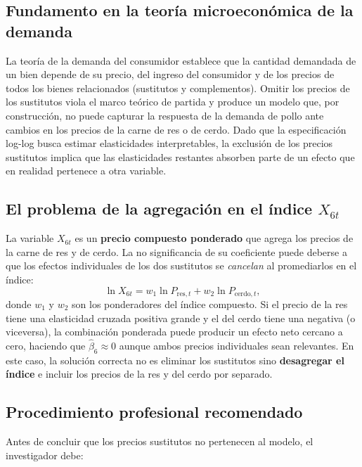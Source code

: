 \documentclass[12pt, letterpaper]{article}
\begin{document}
\subsection{Fundamento en la teoría microeconómica de la demanda}

La teoría de la demanda del consumidor establece que la cantidad demandada
de un bien depende de su precio, del ingreso del consumidor y de los
precios de todos los bienes relacionados (sustitutos y complementos).
Omitir los precios de los sustitutos viola el marco teórico de partida
y produce un modelo que, por construcción, no puede capturar la
respuesta de la demanda de pollo ante cambios en los precios de la carne
de res o de cerdo. Dado que la especificación log-log busca estimar
elasticidades interpretables, la exclusión de los precios sustitutos
implica que las elasticidades restantes absorben parte de un efecto
que en realidad pertenece a otra variable.

\subsection{El problema de la agregación en el índice $X_{6t}$}

La variable $X_{6t}$ es un \textbf{precio compuesto ponderado} que
agrega los precios de la carne de res y de cerdo. La no significancia
de su coeficiente puede deberse a que los efectos individuales de los
dos sustitutos se \emph{cancelan} al promediarlos en el índice:
\begin{equation}
  \ln X_{6t} = w_1 \ln P_{\text{res},t} + w_2 \ln P_{\text{cerdo},t},
  \label{eq:indice}
\end{equation}
donde $w_1$ y $w_2$ son los ponderadores del índice compuesto.
Si el precio de la res tiene una elasticidad cruzada positiva grande
y el del cerdo tiene una negativa (o viceversa), la combinación
ponderada puede producir un efecto neto cercano a cero, haciendo que
$\hat{\beta}_6 \approx 0$ aunque ambos precios individuales sean
relevantes. En este caso, la solución correcta no es eliminar los
sustitutos sino \textbf{desagregar el índice} e incluir los precios
de la res y del cerdo por separado.

\subsection{Procedimiento profesional recomendado}

Antes de concluir que los precios sustitutos no pertenecen al modelo,
el investigador debe:
\end{document}
